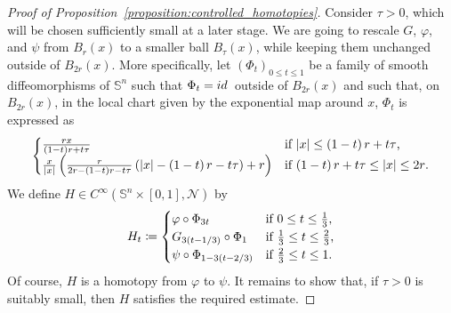 \documentclass[12pt]{amsart}
\def\id{{\rm id\, }}
\def\n{{\mathcal N}}
\def\n{{\mathcal{M}}}
\def\n{{\mathcal N}}
\def\S{{\mathbb S}}
\newcommand{\brac}[1]{\left (#1 \right )}
\newcommand{\abs}[1]{\left |#1 \right |}
\numberwithin{theorem}{section} \numberwithin{equation}{section}
\begin{document}
\begin{proof}[Proof of Proposition~\ref{proposition:controlled_homotopies}]
	Consider $ \tau > 0 $, which will be chosen sufficiently small at a later stage.
	We are going to rescale $ G $, $ \varphi $, and $ \psi $ from $ B_r(x)  $ to a smaller ball $ B_\tau(x) $, while keeping them unchanged outside of $ B_{2r}(x) $.
	More specifically, let $ \brac{\Phi_{t}}_{0 \leq t \leq 1} $ be a family of smooth diffeomorphisms of $ \S^n $ such that $ \Phi_{t} = \id $ outside of $ B_{2r}(x) $ and such that, on $ B_{2r}(x) $, in the local chart given by the exponential map around $ x $, $ \Phi_{t} $ is expressed as
	\[
		\begin{cases}
			\frac{rx}{\brac{1-t}r+t\tau} & \text{if $ \abs{x} \leq \brac{1-t}r+t\tau $,} \\
			\frac{x}{\abs{x}}\brac{\frac{r}{2r-\brac{1-t}r-t\tau}\brac{\abs{x}-\brac{1-t}r-t\tau}+r} & \text{if $ \brac{1-t}r+t\tau \leq \abs{x} \leq 2r $.}
		\end{cases}
	\]
	We define $ H \in C^{\infty}(\S^n\times[0,1],\n)$ by
	\[
		H_{t} \coloneqq
		\begin{cases}
			\varphi \circ \Phi_{3t} & \text{if $ 0 \leq t \leq \frac{1}{3} $,} \\
			G_{3\brac{t-1/3}} \circ \Phi_{1} & \text{if $ \frac{1}{3} \leq t \leq \frac{2}{3} $,} \\
			\psi \circ \Phi_{1-3\brac{t-2/3}} & \text{if $ \frac{2}{3} \leq t \leq 1$.}
		\end{cases}
	\]
	Of course, $ H $ is a homotopy from $ \varphi $ to $ \psi $.
	It remains to show that, if $ \tau > 0 $ is suitably small, then $ H $ satisfies the required estimate.


\end{proof}
\end{document}
